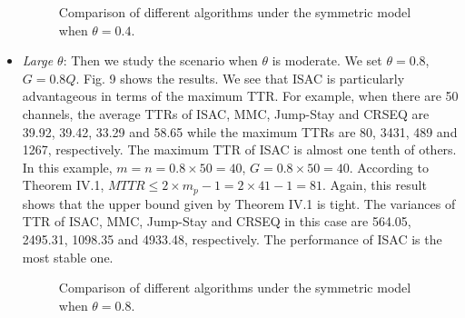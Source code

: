 \documentclass[journal]{IEEEtran}
\begin{document}
\begin{itemize}
\begin{figure}
\centering
{}
\hspace{1in}
\hspace{1in}
\hspace{1in}
\caption{Comparison of different algorithms under the symmetric model when $\theta=0.4$.}
\end{figure}
\item \emph{Large $\theta$}: Then we study the scenario when $\theta$ is moderate. We set $\theta=0.8$, $G=0.8Q$. Fig. 9 shows the results. We see that ISAC is particularly advantageous in terms of the maximum TTR. For example, when there are 50 channels, the average TTRs of ISAC, MMC, Jump-Stay and CRSEQ are 39.92, 39.42, 33.29 and 58.65 while the maximum TTRs are 80, 3431, 489 and 1267, respectively. The maximum TTR of ISAC is almost one tenth of others. In this example, $m=n=0.8\times50=40$, $G=0.8\times50=40$. According to Theorem IV.1, $MTTR\leq 2\times m_p-1=2\times41-1=81$. Again, this result shows that the upper bound given by Theorem IV.1 is tight. The variances of TTR of ISAC, MMC, Jump-Stay and CRSEQ in this case are 564.05, 2495.31, 1098.35 and 4933.48, respectively. The performance of ISAC is the most stable one.
\begin{figure}
\centering
{}
\hspace{1in}
\hspace{1in}
\hspace{1in}
\caption{Comparison of different algorithms under the symmetric model when $\theta=0.8$.}
\end{figure}
\end{itemize}
\end{document}
